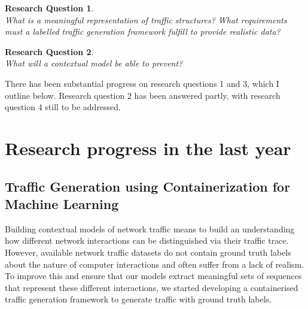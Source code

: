 \documentclass[a4paper,12pt,twoside]{article}
\newtheorem{rquestion}{Research Question}
\begin{document}
\begin{rquestion}\ \\
What is a meaningful representation of traffic structures? What requirements must a labelled traffic generation framework fulfill to provide realistic data?
\end{rquestion}


\begin{rquestion}\ \\
What will a contextual model be able to prevent? 
\end{rquestion}


There has been substantial progress on research questions 1 and 3, which I outline below. Research question 2 has been answered partly, with research question 4 still to be addressed.  



\section{Research progress in the last year}
  
\subsection{Traffic Generation using Containerization for Machine Learning}

Building contextual models of network traffic means to build an understanding how different network interactions can be distinguished via their traffic trace. However, available network traffic datasets do not contain ground truth labels about the nature of computer interactions and often suffer from a lack of realism. To improve this and ensure that our models extract meaningful sets of sequences that represent these different interactions, we started developing a containerised traffic generation framework to generate traffic with ground truth labels. 
\end{document}
